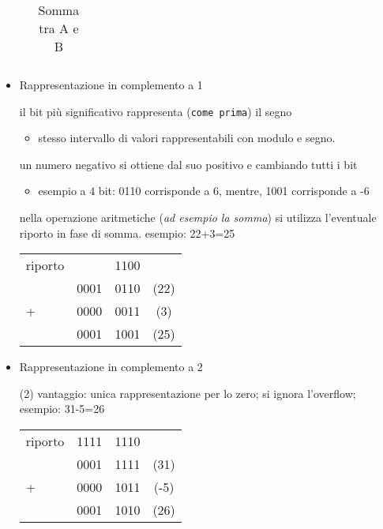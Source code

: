 \begin{itemize}
\begin{itemize}
\begin{table}[h!]
\begin{tabular}{l|ccc|}
					\end{tabular}
					\caption {Somma tra A e B}
				\end{table}
		\end{itemize}
	\item Rappresentazione in complemento a 1
		\begin{tasks}
			\task il bit più significativo rappresenta ({\tt come prima}) il
			segno
			\begin{itemize}
				\item stesso intervallo di valori rappresentabili con modulo e
					segno.
			\end{itemize}
			\task un numero negativo si ottiene dal suo positivo e cambiando
			tutti i bit
			\begin{itemize}
				\item esempio a 4 bit: 0110 corrisponde a 6, mentre, 1001
					corrisponde a -6
			\end{itemize}
			\task nella operazione aritmetiche (\textit{ad esempio la somma})
			si utilizza l'eventuale riporto in fase di somma.
			\task esempio: 22+3=25
			\begin{center}
				\begin{tabular}{lccc}
					riporto&&{\color{red}1100}\\
					&0001&0110&(22)\\
					+&0000&0011&(3)\\\hline
					&0001&1001&(25)
				\end{tabular}
			\end{center}
		\end{tasks}
	\item Rappresentazione in complemento a 2
	\begin{tasks}(2)
		\task vantaggio: unica rappresentazione per lo zero;
		\task si ignora l'overflow;
		\task esempio: 31-5=26
			\begin{center}
				\begin{tabular}{lccc}
					riporto&{\color{red}1111}&{\color{red}1110}\\
					&0001&1111&(31)\\
					+&0000&1011&(-5)\\\hline
					&0001&1010&(26)
				\end{tabular}
			\end{center}
	\end{tasks}
\end{itemize}
